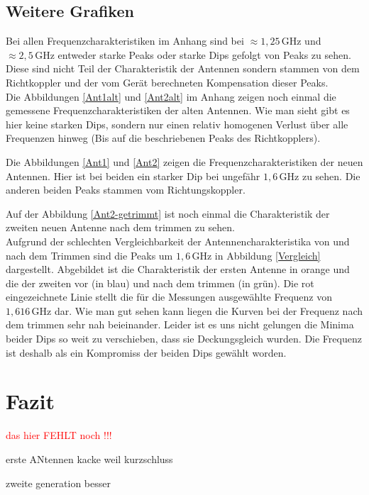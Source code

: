 \documentclass[titlepage,11pt,a4paper,ngerman]{article}
\newcommand{\tx}[1]{\textrm{#1}}
\begin{document}
\subsection{Weitere Grafiken}

Bei allen Frequenzcharakteristiken im Anhang sind bei $ \approx 1{,}25 \, \tx{GHz} $ und $ \approx 2{,}5 \, \tx{GHz} $ entweder starke Peaks oder starke Dips gefolgt von Peaks zu sehen. Diese sind nicht Teil der Charakteristik der Antennen sondern stammen von dem Richtkoppler und der vom Gerät berechneten Kompensation dieser Peaks.\\[10pt]
\noindent
Die Abbildungen \ref{Ant1alt} und \ref{Ant2alt} im Anhang zeigen noch einmal die gemessene Frequenzcharakteristiken der alten Antennen. Wie man sieht gibt es hier keine starken Dips, sondern nur einen relativ homogenen Verlust über alle Frequenzen hinweg (Bis auf die beschriebenen Peaks des Richtkopplers).\par
Die Abbildungen \ref{Ant1} und \ref{Ant2} zeigen die Frequenzcharakteristiken der neuen Antennen. Hier ist bei beiden ein starker Dip bei ungefähr $ 1{,}6 \, \tx{GHz} $ zu sehen. Die anderen beiden Peaks stammen vom Richtungskoppler.\par
Auf der Abbildung \ref{Ant2-getrimmt} ist noch einmal die Charakteristik der zweiten neuen Antenne nach dem trimmen zu sehen.\\[10pt]
\noindent
Aufgrund der schlechten Vergleichbarkeit der Antennencharakteristika von und nach dem Trimmen sind die Peaks um $ 1{,}6 \, \tx{GHz} $ in Abbildung \ref{Vergleich} dargestellt. Abgebildet ist die Charakteristik der ersten Antenne in orange und die der zweiten vor (in blau) und nach dem trimmen (in grün). Die rot eingezeichnete Linie stellt die für die Messungen ausgewählte Frequenz von $ 1{,}616 \, \tx{GHz} $ dar. Wie man gut sehen kann liegen die Kurven bei der Frequenz nach dem trimmen sehr nah beieinander. Leider ist es uns nicht gelungen die Minima beider Dips so weit zu verschieben, dass sie Deckungsgleich wurden. Die Frequenz ist deshalb als ein Kompromiss der beiden Dips gewählt worden.

\section{Fazit}

\textcolor{red}{das hier FEHLT noch !!!}

erste ANtennen kacke weil kurzschluss

zweite generation besser
\end{document}
